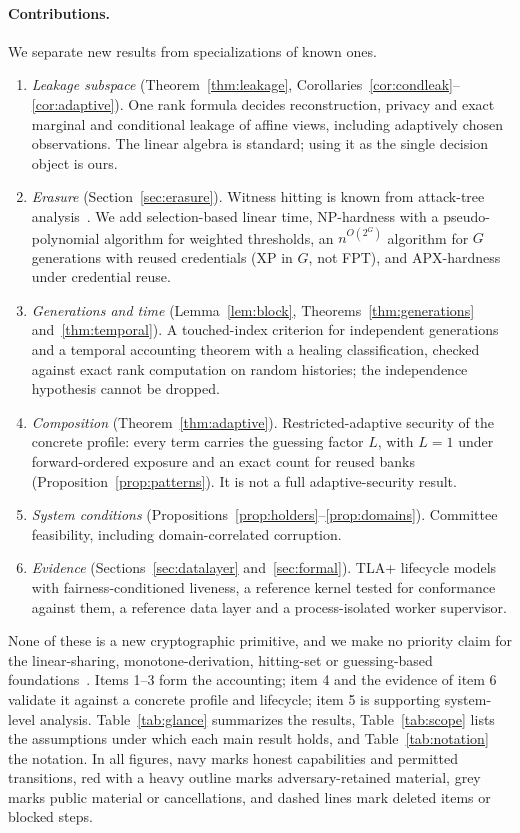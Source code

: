 \documentclass[pdflatex,sn-mathphys-num]{sn-jnl}%
\theoremstyle{plain}
\theoremstyle{definition}
\begin{document}
\paragraph{Contributions.}
We separate new results from specializations of known ones.
\begin{enumerate}
\item \emph{Leakage subspace} (Theorem~\ref{thm:leakage}, Corollaries~\ref{cor:condleak}--\ref{cor:adaptive}). One rank formula decides reconstruction, privacy and exact marginal and conditional leakage of affine views, including adaptively chosen observations. The linear algebra is standard; using it as the single decision object is ours.
\item \emph{Erasure} (Section~\ref{sec:erasure}). Witness hitting is known from attack-tree analysis~\cite{mauw2005,lopuhaa2022}. We add selection-based linear time, NP-hardness with a pseudo-polynomial algorithm for weighted thresholds, an $n^{O(2^G)}$ algorithm for $G$ generations with reused credentials (XP in $G$, not FPT), and APX-hardness under credential reuse.
\item \emph{Generations and time} (Lemma~\ref{lem:block}, Theorems~\ref{thm:generations} and~\ref{thm:temporal}). A touched-index criterion for independent generations and a temporal accounting theorem with a healing classification, checked against exact rank computation on random histories; the independence hypothesis cannot be dropped.
\item \emph{Composition} (Theorem~\ref{thm:adaptive}). Restricted-adaptive security of the concrete profile: every term carries the guessing factor $L$, with $L=1$ under forward-ordered exposure and an exact count for reused banks (Proposition~\ref{prop:patterns}). It is not a full adaptive-security result.
\item \emph{System conditions} (Propositions~\ref{prop:holders}--\ref{prop:domains}). Committee feasibility, including domain-correlated corruption.
\item \emph{Evidence} (Sections~\ref{sec:datalayer} and~\ref{sec:formal}). TLA+ lifecycle models with fairness-conditioned liveness, a reference kernel tested for conformance against them, a reference data layer and a process-isolated worker supervisor.
\end{enumerate}
None of these is a new cryptographic primitive, and we make no priority claim for the linear-sharing, monotone-derivation, hitting-set or guessing-based foundations~\cite{karchmer1993,panjwani2007}. Items 1--3 form the accounting; item 4 and the evidence of item 6 validate it against a concrete profile and lifecycle; item 5 is supporting system-level analysis. Table~\ref{tab:glance} summarizes the results, Table~\ref{tab:scope} lists the assumptions under which each main result holds, and Table~\ref{tab:notation} the notation. In all figures, navy marks honest capabilities and permitted transitions, red with a heavy outline marks adversary-retained material, grey marks public material or cancellations, and dashed lines mark deleted items or blocked steps.
\end{document}
